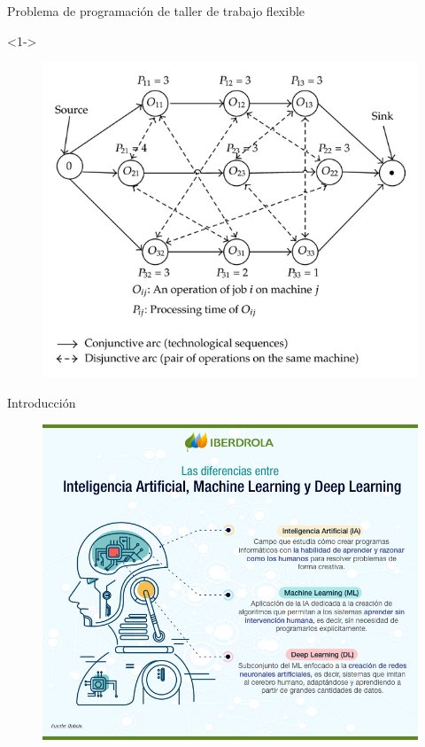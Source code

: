 \documentclass{beamer}
\begin{document}
\begin{frame}{Problema de programación de taller de trabajo flexible}
    \begin{block}<1->{}
        \centering
        \begin{figure}[h!t]
        \centering
        \includegraphics[scale = 1.25 ]{imagen3.jpg}
        \end{figure}
    \end{block}
\end{frame}

\begin{frame}{Introducción}
\begin{figure}[h!t]
\centering
\includegraphics[scale = 1 ]{Deep_Learning_ESP.png}
\end{figure}
\end{frame}
\end{document}
